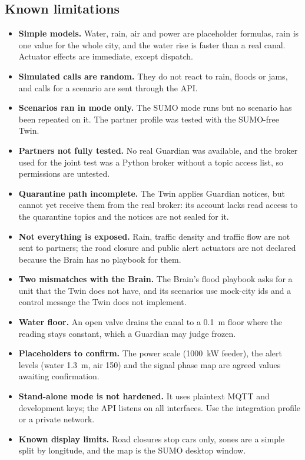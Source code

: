 \subsection{Known limitations}
\begin{itemize}
\item \textbf{Simple models.} Water, rain, air and power are placeholder formulas, rain is one value for the whole city, and the water rise is faster than a real canal. Actuator effects are immediate, except dispatch.
\item \textbf{Simulated calls are random.} They do not react to rain, floods or jams, and calls for a scenario are sent through the API.
\item \textbf{Scenarios ran in  mode only.} The SUMO mode runs but no scenario has been repeated on it. The partner profile was tested with the SUMO-free Twin.
\item \textbf{Partners not fully tested.} No real Guardian was available, and the broker used for the joint test was a Python broker without a topic access list, so permissions are untested.
\item \textbf{Quarantine path incomplete.} The Twin applies Guardian notices, but cannot yet receive them from the real broker: its account lacks read access to the quarantine topics and the notices are not sealed for it.
\item \textbf{Not everything is exposed.} Rain, traffic density and traffic flow are not sent to partners; the road closure and public alert actuators are not declared because the Brain has no playbook for them.
\item \textbf{Two mismatches with the Brain.} The Brain's flood playbook asks for a  unit that the Twin does not have, and its scenarios use mock-city ids and a control message the Twin does not implement.
\item \textbf{Water floor.} An open valve drains the canal to a 0.1~m floor where the reading stays constant, which a Guardian may judge frozen.
\item \textbf{Placeholders to confirm.} The power scale (1000~kW feeder), the alert levels (water 1.3~m, air 150) and the signal phase map are agreed values awaiting confirmation.
\item \textbf{Stand-alone mode is not hardened.} It uses plaintext MQTT and development keys; the API listens on all interfaces. Use the integration profile or a private network.
\item \textbf{Known display limits.} Road closures stop cars only, zones are a simple split by longitude, and the map is the SUMO desktop window.
\end{itemize}
